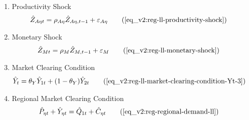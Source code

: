 \documentclass[../thesis.tex]{subfiles}
\begin{document}
{\begin{itemize}
\begin{enumerate}
		\item Productivity Shock
		\begin{alignat}{2}
			\hat{Z}_{A\eta t} &= \rho_{A\eta} \hat{Z}_{A\eta, t-1} + \varepsilon_{A\eta} \tag{\ref{eq_v2:reg-ll-productivity-shock}}
		\end{alignat}
		
		\item Monetary Shock
		\begin{alignat}{2}
			\hat{Z}_{Mt} &= \rho_M \hat{Z}_{M,t-1} + \varepsilon_{M} \tag{\ref{eq_v2:reg-ll-monetary-shock}}
		\end{alignat}
		
		\item Market Clearing Condition
		\begin{align}
			\hat{Y}_{t} &= \theta_{Y} \hat{Y}_{1t} + (1-\theta_{Y}) \hat{Y}_{2t} \tag{\ref{eq_v2:reg-ll-market-clearing-condition-Yt-3}}
		\end{align}
		
		\item Regional Market Clearing Condition
		\begin{align}
			\hat{P}_{\eta t} + \hat{Y}_{\eta t} &= \hat{Q}_{1t} + \hat{C}_{\eta t} \tag{\ref{eq_v2:reg-regional-demand-ll}}
		\end{align}
		
	\end{enumerate}
	
\end{itemize}

} %

\newpage
\end{document}
